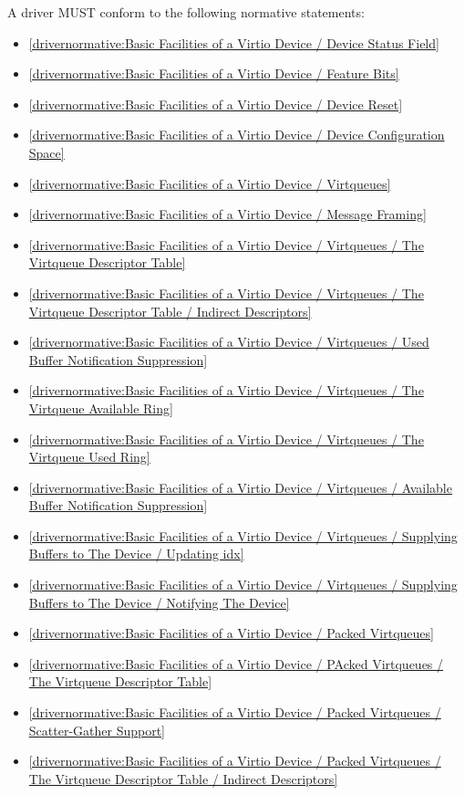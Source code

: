 A driver MUST conform to the following normative statements:

\begin{itemize}
\item \ref{drivernormative:Basic Facilities of a Virtio Device / Device Status Field}
\item \ref{drivernormative:Basic Facilities of a Virtio Device / Feature Bits}
\item \ref{drivernormative:Basic Facilities of a Virtio Device / Device Reset}
\item \ref{drivernormative:Basic Facilities of a Virtio Device / Device Configuration Space}
\item \ref{drivernormative:Basic Facilities of a Virtio Device / Virtqueues}
\item \ref{drivernormative:Basic Facilities of a Virtio Device / Message Framing}
\item \ref{drivernormative:Basic Facilities of a Virtio Device / Virtqueues / The Virtqueue Descriptor Table}
\item \ref{drivernormative:Basic Facilities of a Virtio Device / Virtqueues / The Virtqueue Descriptor Table / Indirect Descriptors}
\item \ref{drivernormative:Basic Facilities of a Virtio Device / Virtqueues / Used Buffer Notification Suppression}
\item \ref{drivernormative:Basic Facilities of a Virtio Device / Virtqueues / The Virtqueue Available Ring}
\item \ref{drivernormative:Basic Facilities of a Virtio Device / Virtqueues / The Virtqueue Used Ring}
\item \ref{drivernormative:Basic Facilities of a Virtio Device / Virtqueues / Available Buffer Notification Suppression}
\item \ref{drivernormative:Basic Facilities of a Virtio Device / Virtqueues / Supplying Buffers to The Device / Updating idx}
\item \ref{drivernormative:Basic Facilities of a Virtio Device / Virtqueues / Supplying Buffers to The Device / Notifying The Device}
\item \ref{drivernormative:Basic Facilities of a Virtio Device / Packed Virtqueues}
\item \ref{drivernormative:Basic Facilities of a Virtio Device / PAcked Virtqueues / The Virtqueue Descriptor Table}
\item \ref{drivernormative:Basic Facilities of a Virtio Device / Packed Virtqueues / Scatter-Gather Support}
\item \ref{drivernormative:Basic Facilities of a Virtio Device / Packed Virtqueues / The Virtqueue Descriptor Table / Indirect Descriptors}

\end{itemize}
